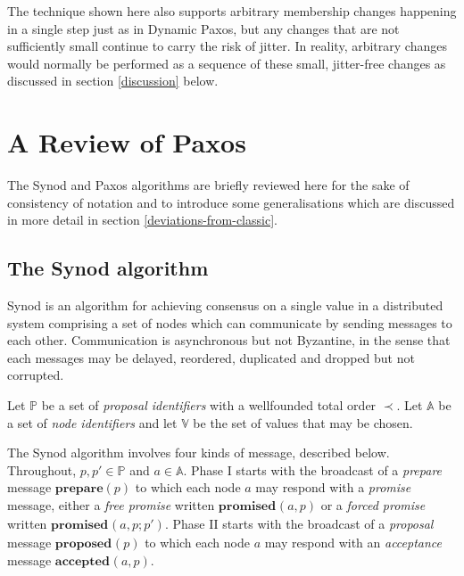 \documentclass[journal]{IEEEtran}
\begin{document}
The technique shown here also supports arbitrary membership changes happening
in a single step just as in Dynamic Paxos, but any changes that are not
sufficiently small continue to carry the risk of jitter. In reality, arbitrary
changes would normally be performed as a sequence of these small, jitter-free
changes as discussed in section \ref{discussion} below.

\section{A Review of Paxos}

The Synod and Paxos algorithms are briefly reviewed here for the sake of
consistency of notation and to introduce some generalisations which are
discussed in more detail in section \ref{deviations-from-classic}.

\subsection{The Synod algorithm}

Synod is an algorithm for achieving consensus on a single value in a
distributed system comprising a set of nodes which can communicate by sending
messages to each other. Communication is asynchronous but not Byzantine, in the
sense that each messages may be delayed, reordered, duplicated and dropped but
not corrupted.

Let $\mathbb P$ be a set of \textit{proposal identifiers} with a wellfounded
total order $\prec$. Let $\mathbb A$ be a set of \textit{node identifiers} and
let $\mathbb V$ be the set of values that may be chosen.

\def\prep#1{\mathbf{prepare}(#1)}
\def\mprom#1#2#3{\mathbf{promised}_{\ge #1}(#2,#3)}
\def\fprom#1#2#3{\mathbf{promised}_{#1}(#2,#3)}
\def\bprom#1#2#3#4{\mathbf{promised}_{#1}(#2,#3;#4)}
\def\prop#1#2{\mathbf{proposed}_{#1}(#2)}
\def\acc#1#2#3{\mathbf{accepted}_{#1}(#2,#3)}
\def\chosen#1#2{\mathbf{chosen}_{#1}(#2)}
\def\owner#1{\mathrm{owner}(#1)}

The Synod algorithm involves four kinds of message, described below.
Throughout, $p, p' \in \mathbb P$ and $a \in \mathbb A$.  Phase I starts with
the broadcast of a \textit{prepare} message $\prep{p}$ to which each node $a$
may respond with a \textit{promise} message, either a \textit{free promise}
written $\fprom{}{a}{p}$ or a \textit{forced promise} written
$\bprom{}{a}{p}{p'}$.  Phase II starts with the broadcast of a
\textit{proposal} message $\prop{}{p}$ to which each node $a$ may respond with
an \textit{acceptance} message $\acc{}{a}{p}$.
\end{document}
